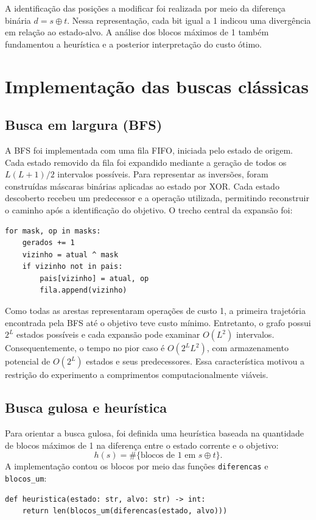 \documentclass[10pt,a4paper,twocolumn]{article}
\begin{document}
A identificação das posições a modificar foi realizada por meio da diferença binária $d=s\oplus t$. Nessa representação, cada bit igual a 1 indicou uma divergência em relação ao estado-alvo. A análise dos blocos máximos de 1 também fundamentou a heurística e a posterior interpretação do custo ótimo.

\section{Implementação das buscas clássicas}
\subsection{Busca em largura (BFS)}
A BFS foi implementada com uma fila FIFO, iniciada pelo estado de origem. Cada estado removido da fila foi expandido mediante a geração de todos os $L(L+1)/2$ intervalos possíveis. Para representar as inversões, foram construídas máscaras binárias aplicadas ao estado por XOR. Cada estado descoberto recebeu um predecessor e a operação utilizada, permitindo reconstruir o caminho após a identificação do objetivo. O trecho central da expansão foi:
\begin{lstlisting}
for mask, op in masks:
    gerados += 1
    vizinho = atual ^ mask
    if vizinho not in pais:
        pais[vizinho] = atual, op
        fila.append(vizinho)
\end{lstlisting}

Como todas as arestas representaram operações de custo 1, a primeira trajetória encontrada pela BFS até o objetivo teve custo mínimo. Entretanto, o grafo possui $2^L$ estados possíveis e cada expansão pode examinar $O(L^2)$ intervalos. Consequentemente, o tempo no pior caso é $O(2^L L^2)$, com armazenamento potencial de $O(2^L)$ estados e seus predecessores. Essa característica motivou a restrição do experimento a comprimentos computacionalmente viáveis.

\subsection{Busca gulosa e heurística}
Para orientar a busca gulosa, foi definida uma heurística baseada na quantidade de blocos máximos de 1 na diferença entre o estado corrente e o objetivo:
\begin{equation}
\boxed{h(s)=\#\{\text{blocos de 1 em }s\oplus t\}.}
\end{equation}
A implementação contou os blocos por meio das funções \texttt{diferencas} e \texttt{blocos\_um}:
\begin{lstlisting}
def heuristica(estado: str, alvo: str) -> int:
    return len(blocos_um(diferencas(estado, alvo)))
\end{lstlisting}
\end{document}
